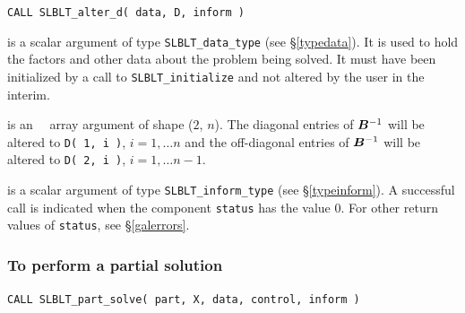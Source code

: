 \documentclass{galahad}
\newcommand{\packagename}{SLBLT}
\begin{document}
\hskip0.5in
{\tt CALL \packagename\_alter\_d( data, D, inform )}

\begin{description}

 is a scalar \intentinout argument of type
{\tt \packagename\_data\_type}
(see \S\ref{typedata}). It is used to hold the factors and other
data about the problem being solved.
It must have been initialized by a call to
{\tt \packagename\_ini\-tialize} and not altered by the user in the interim.

 is an \intentinout\ \realdp\ array argument of shape ($2$, $n$).
The diagonal entries of ${\bm{B}}^{-1} $ will
be altered to {\tt D( 1, i )}, $i = 1, \ldots n$ and the off-diagonal
entries of ${\bm{B}}^{-1} $ will be altered to {\tt D( 2, i )},
$i = 1, \ldots n-1$.

 is a scalar \intentinout argument of type
{\tt \packagename\_inform\_type}
(see \S\ref{typeinform}).
A successful call is indicated when the  component {\tt status} has the value 0.
For other return values of {\tt status}, see \S\ref{galerrors}.

\end{description}

\subsubsection{To perform a partial solution}

\hskip0.5in
{\tt CALL \packagename\_part\_solve( part, X, data, control, inform )}
\end{document}

